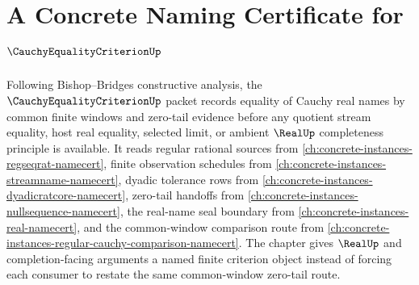\chapter{A Concrete Naming Certificate for $\CauchyEqualityCriterionUp$}
\label{ch:concrete-instances-cauchy-equality-criterion-namecert}

Following Bishop--Bridges constructive analysis, the $\CauchyEqualityCriterionUp$ packet records equality of Cauchy real names by common finite windows and zero-tail evidence before any quotient stream equality, host real equality, selected limit, or ambient $\RealUp$ completeness principle is available. It reads regular rational sources from \autoref{ch:concrete-instances-regseqrat-namecert}, finite observation schedules from \autoref{ch:concrete-instances-streamname-namecert}, dyadic tolerance rows from \autoref{ch:concrete-instances-dyadicratcore-namecert}, zero-tail handoffs from \autoref{ch:concrete-instances-nullsequence-namecert}, the real-name seal boundary from \autoref{ch:concrete-instances-real-namecert}, and the common-window comparison route from \autoref{ch:concrete-instances-regular-cauchy-comparison-namecert}. The chapter gives $\RealUp$ and completion-facing arguments a named finite criterion object instead of forcing each consumer to restate the same common-window zero-tail route.

